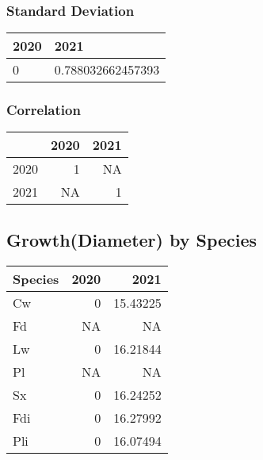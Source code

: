 \documentclass[
]{article}
\begin{document}
\hypertarget{standard-deviation-2}{%
\subsubsection{Standard Deviation}\label{standard-deviation-2}}

\begin{table}[H]
\centering
\begin{tabular}{l|l}
\hline
2020 & 2021\\
\hline
0 & 0.788032662457393\\
\hline
\end{tabular}
\end{table}

\hypertarget{correlation-2}{%
\subsubsection{Correlation}\label{correlation-2}}

\begin{table}[H]
\centering
\begin{tabular}{l|r|r}
\hline
  & 2020 & 2021\\
\hline
2020 & 1 & NA\\
\hline
2021 & NA & 1\\
\hline
\end{tabular}
\end{table}

\hypertarget{growthdiameter-by-species}{%
\subsection{Growth(Diameter) by
Species}\label{growthdiameter-by-species}}

\begin{table}[H]
\centering
\begin{tabular}{l|r|r}
\hline
Species & 2020 & 2021\\
\hline
Cw & 0 & 15.43225\\
\hline
Fd & NA & NA\\
\hline
Lw & 0 & 16.21844\\
\hline
Pl & NA & NA\\
\hline
Sx & 0 & 16.24252\\
\hline
Fdi & 0 & 16.27992\\
\hline
Pli & 0 & 16.07494\\
\hline
\end{tabular}
\end{table}
\end{document}

